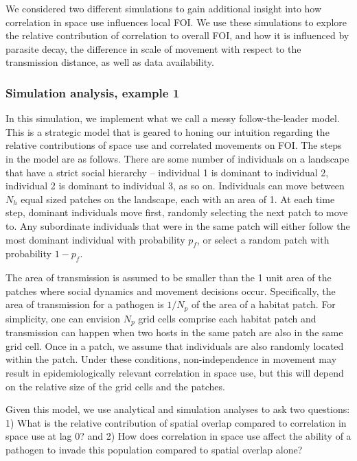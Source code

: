 \documentclass[letterpaper]{article}
\begin{document}
We considered two different simulations to gain additional insight into how correlation in space use influences local FOI. We use these simulations to explore the relative contribution of correlation to overall FOI, and how it is influenced by parasite decay, the difference in scale of movement with respect to the transmission distance, as well as data availability.  %

\subsubsection*{Simulation analysis, example 1}

In this simulation, we implement what we call a messy follow-the-leader model.  This is a strategic model that is geared to honing our intuition regarding the relative contributions of space use and correlated movements on FOI. The steps in the model are as follows. There are some number of individuals on a landscape that have a strict social hierarchy -- individual 1 is dominant to individual 2, individual 2 is dominant to individual 3, as so on. Individuals can move between $N_h$ equal sized patches on the landscape, each with an area of 1. At each time step, dominant individuals move first, randomly selecting the next patch to move to. Any subordinate individuals that were in the same patch will either follow the most dominant individual with probability $p_f$, or select a random patch with probability $1 - p_f$.

The area of transmission is assumed to be smaller than the 1 unit area of the patches where social dynamics and movement decisions occur. Specifically, the area of transmission for a pathogen is $1 / N_p$ of the area of a habitat patch.  For simplicity, one can envision $N_p$ grid cells comprise each habitat patch and transmission can happen when two hosts in the same patch are also in the same grid cell. Once in a patch, we assume that individuals are also randomly located within the patch. Under these conditions, non-independence in movement may result in epidemiologically relevant correlation in space use, but this will depend on the relative size of the grid cells and the patches. 

Given this model, we use analytical and simulation analyses to ask two questions:  1) What is the relative contribution of spatial overlap compared to correlation in space use at lag 0? and 2) How does correlation in space use affect the ability of a pathogen to invade this population compared to spatial overlap alone? 
\end{document}
